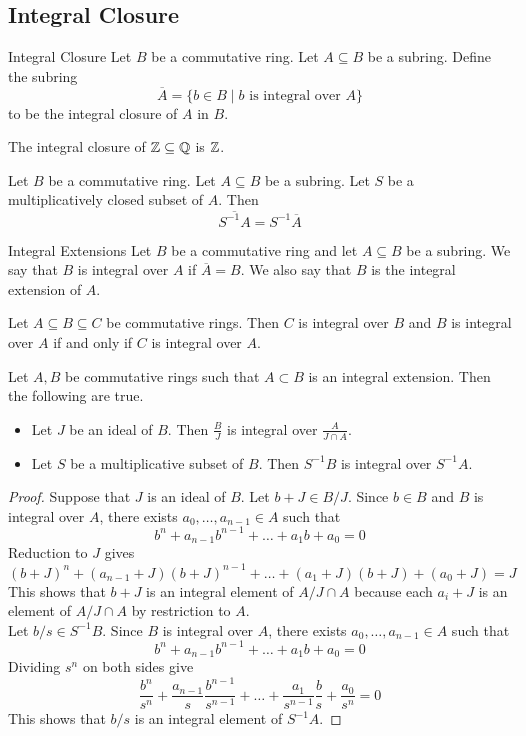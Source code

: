 \documentclass[a4paper]{article}
\begin{document}
\subsection{Integral Closure}
\begin{defn}{Integral Closure}{} Let $B$ be a commutative ring. Let $A\subseteq B$ be a subring. Define the subring $$\overline{A}=\{b\in B\;|\;b\text{ is integral over }A\}$$ to be the integral closure of $A$ in $B$. 
\end{defn}

\begin{eg}{}{} The integral closure of $\mathbb{Z}\subseteq\mathbb{Q}$ is $\mathbb{Z}$. 
\end{eg}

\begin{prp}{}{} Let $B$ be a commutative ring. Let $A\subseteq B$ be a subring. Let $S$ be a multiplicatively closed subset of $A$. Then $$\overline{S^{-1}A}=S^{-1}\overline{A}$$
\end{prp}

\begin{defn}{Integral Extensions}{} Let $B$ be a commutative ring and let $A\subseteq B$ be a subring. We say that $B$ is integral over $A$ if $\overline{A}=B$. We also say that $B$ is the integral extension of $A$. 
\end{defn}

\begin{lmm}{}{} Let $A\subseteq B\subseteq C$ be commutative rings. Then $C$ is integral over $B$ and $B$ is integral over $A$ if and only if $C$ is integral over $A$. 
\end{lmm}

\begin{prp}{}{} Let $A,B$ be commutative rings such that $A\subset B$ is an integral extension. Then the following are true. 
\begin{itemize}
\item Let $J$ be an ideal of $B$. Then $\frac{B}{J}$ is integral over $\frac{A}{J\cap A}$. 
\item Let $S$ be a multiplicative subset of $B$. Then $S^{-1}B$ is integral over $S^{-1}A$. 
\end{itemize} 
\begin{proof}
Suppose that $J$ is an ideal of $B$. Let $b+J\in B/J$. Since $b\in B$ and $B$ is integral over $A$, there exists $a_0,\dots,a_{n-1}\in A$ such that $$b^n+a_{n-1}b^{n-1}+\dots+a_1b+a_0=0$$ Reduction to $J$ gives $$(b+J)^n+(a_{n-1}+J)(b+J)^{n-1}+\dots+(a_1+J)(b+J)+(a_0+J)=J$$ This shows that $b+J$ is an integral element of $A/J\cap A$ because each $a_i+J$ is an element of $A/J\cap A$ by restriction to $A$. \\

Let $b/s\in S^{-1}B$. Since $B$ is integral over $A$, there exists $a_0,\dots,a_{n-1}\in A$ such that $$b^n+a_{n-1}b^{n-1}+\dots+a_1b+a_0=0$$ Dividing $s^n$ on both sides give $$\frac{b^n}{s^n}+\frac{a_{n-1}}{s}\frac{b^{n-1}}{s^{n-1}}+\dots+\frac{a_1}{s^{n-1}}\frac{b}{s}+\frac{a_0}{s^n}=0$$ This shows that $b/s$ is an integral element of $S^{-1}A$. 
\end{proof}
\end{prp}
\end{document}
